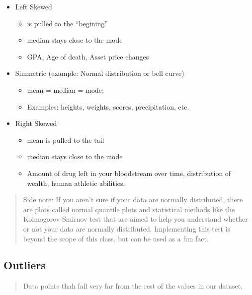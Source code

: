 \documentclass[]{book}
\providecommand{\tightlist}{%
  \setlength{\itemsep}{0pt}\setlength{\parskip}{0pt}}
\begin{document}
\begin{itemize}
\tightlist
\item
  Left Skewed

  \begin{itemize}
  \tightlist
  \item
    is pulled to the ``begining''
  \item
    median stays close to the mode
  \item
    GPA, Age of death, Asset price changes
  \end{itemize}
\item
  Simmetric (example: Normal distribution or bell curve)

  \begin{itemize}
  \tightlist
  \item
    mean = median = mode;
  \item
    Examples: heights, weights, scores, precipitation, etc.
  \end{itemize}
\item
  Right Skewed

  \begin{itemize}
  \tightlist
  \item
    mean is pulled to the tail
  \item
    median stays close to the mode
  \item
    Amount of drug left in your bloodstream over time, distribution of
    wealth, human athletic abilities.
  \end{itemize}
\end{itemize}

\begin{quote}
Side note: If you aren't sure if your data are normally distributed,
there are plots called normal quantile plots and statistical methods
like the Kolmogorov-Smirnov test that are aimed to help you understand
whether or not your data are normally distributed. Implementing this
test is beyond the scope of this class, but can be used as a fun fact.
\end{quote}

\subsection{Outliers}\label{outliers}

\begin{quote}
Data points thah fall very far from the rest of the values in our
dataset.
\end{quote}
\end{document}
